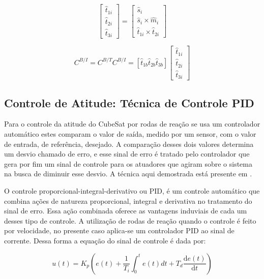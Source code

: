 \begin{equation}
\begin{bmatrix} \hat{t}_{1i} \\ \hat{t}_{2i} \\ \hat{t}_{3i}
\end{bmatrix} = \begin{bmatrix} \hat{s}_i \\  \hat{s}_i\times\hat{m}_i
\\ \hat{t}_{1i}\times\hat{t}_{2i}
\end{bmatrix}
\end{equation}

\begin{equation}
C^{B/I} = C^{B/T}C^{B/I}=\left [\hat{t}_{1b} \hat{t}_{2b} \hat{t}_{3b}  \right ]
\begin{bmatrix} \hat{t}_{1i}\\\hat{t}_{2i}\\\hat{t}_{3i}
\end{bmatrix}
\end{equation}

\subsection{Controle de Atitude: Técnica de Controle PID}\label{sec:3.1.6}

Para o controle da atitude do CubeSat por rodas de reação se usa um controlador automático estes comparam o valor de saída, medido por um sensor, com o valor de entrada, de referência, desejado. A comparação desses dois valores determina um desvio chamado de erro, e esse sinal de erro é tratado pelo controlador que gera por fim um sinal de controle para os atuadores que agiram sobre o sistema na busca de diminuir esse desvio. A técnica aqui demostrada está presente em \cite[p.~21]{ogata2011engenharia}.

O controle proporcional-integral-derivativo ou PID, é um controle automático que combina ações de natureza proporcional, integral e derivativa no tratamento do sinal de erro. Essa ação combinada oferece as vantagens induviais de cada um desses tipo de controle. 
A utilização de rodas de reação quando o controle é feito por velocidade, no presente caso aplica-se um controlador PID ao sinal de corrente. Dessa forma a equação do sinal de controle é dada por:

\begin{equation}
u(t)=K_p\left(e(t)+\frac{1}{T_i}\int_{0}^{t}e(t)dt+T_d\frac{\mathrm{d}e(t) }{\mathrm{d} t}\right )
\end{equation}

